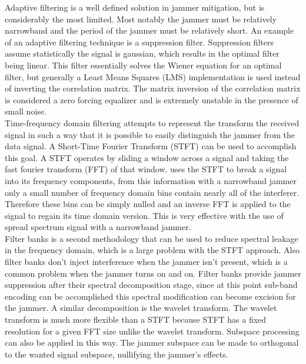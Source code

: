 Adaptive filtering is a well defined solution in jammer mitigation, but is considerably the most limited.  Most notably the jammer must be relatively narrowband and the period of the jammer must be relatively short.  An example of an adaptive filtering technique is a suppression filter.  Suppression filters assume statistically the signal is gaussian, which results in the optimal filter being linear.  This filter essentially solves the Wiener equation for an optimal filter, but generally a Least Means Squares (LMS) implementation is used instead of inverting the correlation matrix\cite{11}. The matrix inversion of the correlation matrix is considered a zero forcing equalizer and is extremely unstable in the presence of small noise.\\


Time-frequency domain filtering attempts to represent the transform the received signal in such a way that it is possible to easily distinguish the jammer from the data signal.  A Short-Time Fourier Transform (STFT) can be used to accomplish this goal.  A STFT operates by sliding a window across a signal and taking the fast fourier transform (FFT) of that window.  \cite{12} uses the STFT to break a signal into its frequency components, from this information with a narrowband jammer only a small number of frequency domain bins contain nearly all of the interferer.  Therefore these bins can be simply nulled and an inverse FFT is applied to the signal to regain its time domain version.  This is very effective with the use of spread spectrum signal with a narrowband jammer.\\

%
%

Filter banks is a second methodology that can be used to reduce spectral leakage in the frequency domain, which is a large problem with the STFT approach.  Also filter banks don't inject interference when the jammer isn't present, which is a common problem when the jammer turns on and on.  Filter banks provide jammer suppression after their spectral decomposition stage, since at this point sub-band encoding can be accomplished this spectral modification can become excision for the jammer\cite{13}.  A similar decomposition is the wavelet transform.  The wavelet transform is much more flexible than a STFT because STFT has a fixed resolution for a given FFT size unlike the wavelet transform.  Subspace processing can also be applied in this way.  The jammer subspace can be made to orthogonal to the wanted signal subspace, nullifying the jammer's effects\cite{14}.\\

